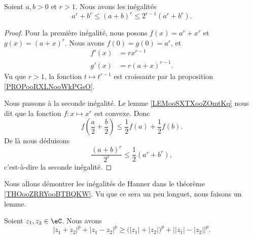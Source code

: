 \begin{lemma}       \label{LEMooFKKEooDTypUd}
    Soient \( a,b>0\) et \( r>1\). Nous avons les inégalités
    \begin{equation}
        a^r+b^r\leq (a+b)^r\leq 2^{r-1}(a^r+b^r).
    \end{equation}
\end{lemma}

\begin{proof}
    Pour la première inégalité, nous posons \( f(x)=a^r+x^r\) et \( g(x)=(a+x)^r\). Nous avons \( f(0)=g(0)=a^r\), et
    \begin{subequations}
        \begin{align}
            f'(x)&=rx^{r-1}\\
            g'(x)&=r(a+x)^{r-1}.
        \end{align}
    \end{subequations}
    Vu que \( r>1\), la fonction \( t\mapsto t^{r-1}\) est croissante par la proposition \ref{PROPooRXLNooWkPGsO}.

    Nous passons à la seconde inégalité. Le lemme \ref{LEMooSXTXooZOmtKq} nous dit que la fonction \( f\colon x\mapsto x^r \) est convexe. Donc
    \begin{equation}
        f\left( \frac{ a }{2}+\frac{ b }{2} \right)\leq\frac{ 1 }{2}f(a)+\frac{ 1 }{2}f(b).
    \end{equation}
    De là nous déduisons
    \begin{equation}
        \frac{ (a+b)^r }{ 2^r }\leq \frac{ 1 }{2}(a^r+b^r),
    \end{equation}
    c'est-à-dire la seconde inégalité.
\end{proof}

Nous allons démontrer les inégalités de Hanner dans le théorème \ref{THOooZRRYooBTBQKW}. Vu que ce sera un peu longuet, nous faisons un lemme.
\begin{lemma}       \label{LEMooDHRCooQiSpyC}
    Soient \( z_1,z_2\in \eC\). Nous avons
    \begin{equation}        \label{EQooMUXVooSpGSyG}
        | z_1+z_2 |^p+| z_1-z_2 |^p\geq \big( | z_1 |+| z_2 | \big)^p+\big| | z_1 |-| z_2 | \big|^p.
    \end{equation}
\end{lemma}

